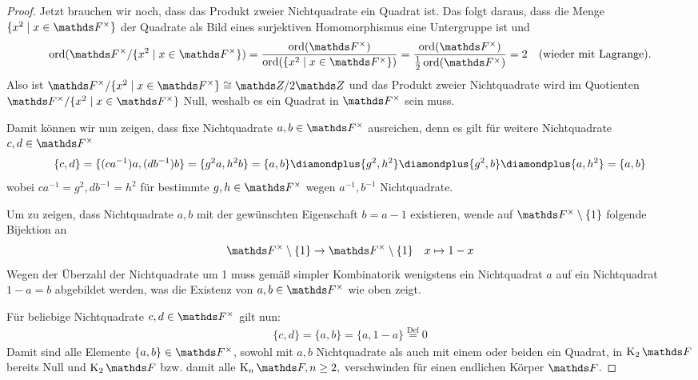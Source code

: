 \documentclass[ngerman,fontsize=11pt, paper=a4, parskip=half, titlepage=true, toc=bib]{scrartcl}
\begin{document}
\begin{Lem}
\begin{proof}
    Jetzt brauchen wir noch, dass das Produkt zweier Nichtquadrate ein
    Quadrat ist. Das folgt daraus, dass  die Menge 
    $\{x^2\mid x\in\Fx\}$ der Quadrate 
    als Bild eines surjektiven Homomorphismus eine Untergruppe ist und 
    \begin{gather*}
      \Ord(\Fx/\{x^2\mid x\in\Fx\})
      =\frac{\Ord(\Fx)}{\Ord(\{x^2\mid x\in\Fx\})}
      =\frac{\Ord(\Fx)}{\frac{1}{2}\Ord(\Fx)}=2
      \quad\text{(wieder mit Lagrange).}
    \end{gather*} 
    Also ist $\Fx/\{x^2\mid x\in\Fx\}\cong \Z/2\Z$ und das Produkt 
    zweier Nichtquadrate wird im Quotienten
    $\Fx/\{x^2\mid x\in\Fx\}$ Null, weshalb es ein Quadrat in $\Fx$
    sein muss.

    Damit können wir nun zeigen, dass fixe Nichtquadrate $a,b\in\Fx$
    ausreichen, denn es gilt für weitere Nichtquadrate $c,d\in\Fx$
    \begin{gather*}
      \{c,d\}=\{(ca^{-1})a,(db^{-1})b\}=\{g^2a,h^2b\}
      =\{a,b\}\p\{g^2,h^2\}\p\{g^2,b\}\p\{a,h^2\}
      =\{a,b\}
    \end{gather*}
    wobei $ca^{-1}=g^2,db^{-1}=h^2$ für bestimmte $g,h\in\Fx$
    wegen $a^{-1},b^{-1}$ Nichtquadrate.

    Um zu zeigen, dass Nichtquadrate $a,b$ mit der gewünschten
    Eigenschaft $b=a-1$ existieren, wende auf $\Fx\setminus\{1\}$ 
    folgende Bijektion an
    \begin{align*}
      \Fx\setminus\{1\}&\to \Fx\setminus\{1\}
      &x\mapsto 1-x
    \end{align*}
    Wegen der Überzahl der Nichtquadrate um 1 muss gemäß simpler
    Kombinatorik wenigstens ein Nichtquadrat $a$  auf ein Nichtquadrat
    $1-a=b$ abgebildet werden, was die Existenz
    von $a,b\in\Fx$ wie oben zeigt.

    Für beliebige Nichtquadrate $c,d\in\Fx$ gilt nun:
    \begin{gather*}
      \{c,d\}=\{a,b\}=\{a,1-a\} \overset{\text{Def}}{=} 0
    \end{gather*}
    Damit sind alle Elemente $\{a,b\}\in\Fx$, sowohl mit $a,b$
    Nichtquadrate als auch mit einem oder beiden ein Quadrat, 
    in $\K_2\F$ bereits Null und $\K_2\F$
    bzw. damit alle $\K_n\F,n\geq 2,$ verschwinden für einen endlichen
    Körper $\F$.
  \end{proof}
\end{Lem}



\end{document}
